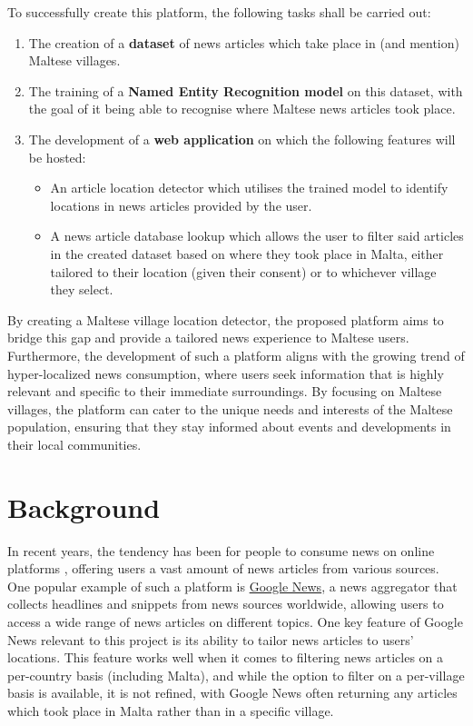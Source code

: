 \documentclass[a4paper, oneside, 11pt]{article}
\begin{document}
\begin{multicols*}{2}
  To successfully create this platform, the following tasks shall be carried out:
  \begin{enumerate}
    \item The creation of a \textbf{dataset} of news articles which take place in (and mention) Maltese villages.
    \item The training of a \textbf{Named Entity Recognition model} on this dataset, with the goal of it being able to recognise where Maltese news articles took place.
    \item The development of a \textbf{web application} on which the following features will be hosted:
    \begin{itemize}
      \item An article location detector which utilises the trained model to identify locations in news articles provided by the user.
      \item A news article database lookup which allows the user to filter said articles in the created dataset based on where they took place in Malta, either tailored to their location (given their consent) or to whichever village they select.
    \end{itemize}
  \end{enumerate}

  By creating a Maltese village location detector, the proposed platform aims to bridge this gap and provide a tailored news experience to Maltese users. Furthermore, the development of such a platform aligns with the growing trend of hyper-localized news consumption, where users seek information that is highly relevant and specific to their immediate surroundings. By focusing on Maltese villages, the platform can cater to the unique needs and interests of the Maltese population, ensuring that they stay informed about events and developments in their local communities.


  \section{Background}
  In recent years, the tendency has been for people to consume news on online platforms \cite{bennett2008digital} \cite{ripolles2012beyond}, offering users a vast amount of news articles from various sources. One popular example of such a platform is \href{https://news.google.com/}{Google News}, a news aggregator that collects headlines and snippets from news sources worldwide, allowing users to access a wide range of news articles on different topics. One key feature of Google News relevant to this project is its ability to tailor news articles to users' locations. This feature works well when it comes to filtering news articles on a per-country basis (including Malta), and while the option to filter on a per-village basis is available, it is not refined, with Google News often returning any articles which took place in Malta rather than in a specific village.


\end{multicols*}
\end{document}
